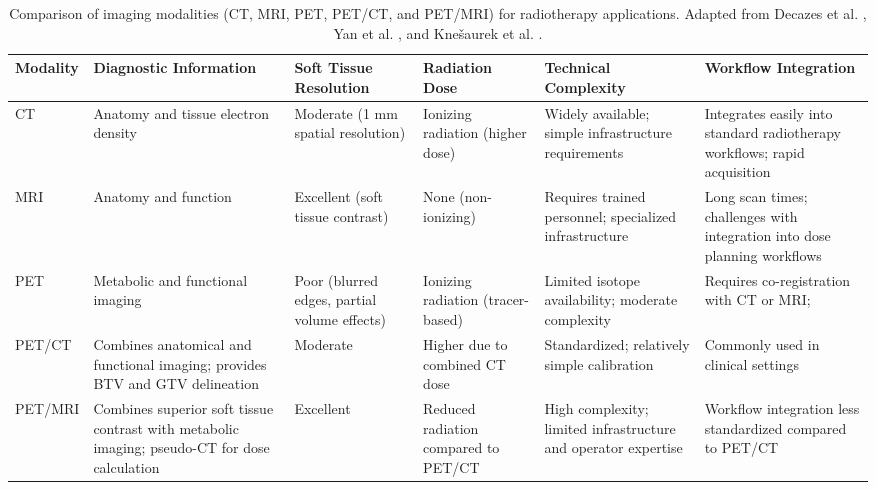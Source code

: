 \documentclass[11pt]{article} %
\begin{document}
\begin{table}[H]
\centering
\begin{tabular}{|l|>{\raggedright\arraybackslash}p{3.5cm}|>{\raggedright\arraybackslash}p{2.5cm}|>{\raggedright\arraybackslash}p{2.5cm}|>{\raggedright\arraybackslash}p{2.5cm}|>{\raggedright\arraybackslash}p{2.5cm}|}
\hline
\textbf{Modality} & \textbf{Diagnostic Information} & \textbf{Soft Tissue Resolution} & \textbf{Radiation Dose} & \textbf{Technical Complexity} & \textbf{Workflow Integration} \\ \hline
CT & Anatomy and tissue electron density & Moderate (1 mm spatial resolution) & Ionizing radiation (higher dose) & Widely available; simple infrastructure requirements & Integrates easily into standard radiotherapy workflows; rapid acquisition \\ \hline
MRI & Anatomy and function & Excellent (soft tissue contrast) & None (non-ionizing) & Requires trained personnel; specialized infrastructure & Long scan times; challenges with integration into dose planning workflows \\ \hline
PET & Metabolic and functional imaging & Poor (blurred edges, partial volume effects) & Ionizing radiation (tracer-based) & Limited isotope availability; moderate complexity   & Requires co-registration with CT or MRI; \\ \hline
PET/CT & Combines anatomical and functional imaging; provides BTV and GTV delineation & Moderate & Higher due to combined CT dose & Standardized; relatively simple calibration & Commonly used in clinical settings \\ \hline
PET/MRI & Combines superior soft tissue contrast with metabolic imaging; pseudo-CT for dose calculation & Excellent & Reduced radiation compared to PET/CT & High complexity; limited infrastructure and operator expertise & Workflow integration less standardized compared to PET/CT \\ \hline
\end{tabular}
\caption{Comparison of imaging modalities (CT, MRI, PET, PET/CT, and PET/MRI) for radiotherapy applications. Adapted from Decazes et al. \cite{decazes2021}, Yan et al. \cite{yan2024}, and Knešaurek et al. \cite{knesaurek2018}.}
\label{tab:modality_comparison}
\end{table}
\end{document}
